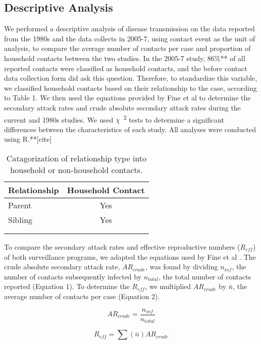 \subsection{Descriptive Analysis}
We performed a descriptive analysis of disease transmission on the data reported from the 1980s and the data collects in 2005-7, using contact event as the unit of analysis, to compare the average number of contacts per case and proportion of household contacts between the two studies. In the 2005-7 study, 86\%** of all reported contacts were classified as household contacts, and the before contact data collection form did ask this question. Therefore, to standardize this variable, we classified household contacts based on their relationship to the case, according to Table 1. We then used the equations provided by Fine et al \cite{Fine1988} to determine the secondary attack rates and crude absolute secondary attack rates during the current and 1980s studies. We used $\chi$\ \textsuperscript{2} tests to determine a significant differences between the characteristics of each study. All analyses were conducted using R.**[cite]

\begin{table} 
\centering
\caption{Catagorization of relationship type into household or non-household contacts.} 
    \begin{tabular}{ l c }
    \toprule
        Relationship & Household Contact \\ 
        \midrule
        Parent & Yes \\ 
        Sibling & Yes \\ 
         &  \\ 
         &  \\ 
         \bottomrule
    \end{tabular} 
\end{table}

To compare the secondary attack rates and effective reproductive numbers ($R_{eff}$) of both surveillance programs, we adapted the equations used by Fine et al \cite{Fine1988}. 
The crude absolute secondary attack rate, $AR_{crude}$, was found by dividing $n_{inf}$, the number of contacts subsequently infected by $n_{total}$, the total number of contacts reported (Equation 1). To determine the $R_{eff}$, we multiplied $AR_{crude}$ by $\bar{n}$, the average number of contacts per case (Equation 2).

\begin{equation}
\label{eqn:equation 1}
AR_{crude}=\frac{n_{inf}}{n_{total}}
\end{equation}

\begin{equation}
\label{eqn:equation 2}
R_{eff}=\sum \left ( \bar{n} \right )AR_{crude}
\end{equation}